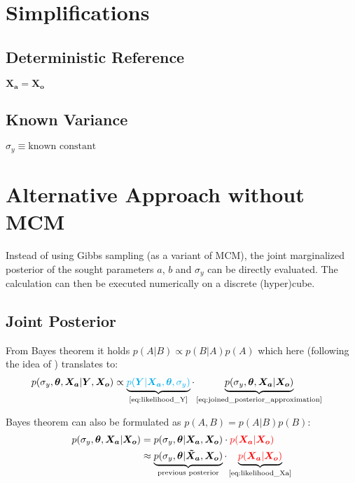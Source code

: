 \documentclass[10pt]{article}
\renewcommand{\vec}[1]{\boldsymbol{#1}}
\begin{document}
    
\section{Simplifications}

\subsection{Deterministic Reference}
$\vec{X_a} = \vec{X_o}$

\subsection{Known Variance}
$\sigma_y \equiv \text{known constant}$


\section{Alternative Approach without MCM}
Instead of using Gibbs sampling (as a variant of MCM), the joint marginalized posterior of the sought parameters $a$, $b$ and $\sigma_y$ can be directly evaluated. 
The calculation can then be executed numerically on a discrete (hyper)cube. 

\subsection{Joint Posterior}
From Bayes theorem it holds $p(A | B) \propto p(B | A) p(A)$ which here (following the idea of \cite{dellaportas_1995}) translates to:
\begin{align}
    p(\sigma_y, \vec{\theta}, \vec{X_a} | \vec{Y}, \vec{X_o}) 
    &\propto \underbrace{{\color{cyan} p(\vec{Y} | \vec{X_a}, \vec{\theta}, \sigma_y)}}_{\text{\cref{eq:likelihood_Y}}} 
    \cdot \underbrace{p(\sigma_y, \vec{\theta}, \vec{X_a} | \vec{X_o})}_{\text{\cref{eq:joined_posterior_approximation}}}  \label{eq:joint_posterior_with_Xa}
\end{align}

Bayes theorem can also be formulated as $p(A, B) = p(A|B) p(B)$:
\begin{align}
    p(\sigma_y, \vec{\theta}, \vec{X_a} | \vec{X_o})
    &= p(\sigma_y, \vec{\theta} |  \vec{X_a}, \vec{X_o})
    \cdot {\color{red} p(\vec{X_a} | \vec{X_o})} \label{eq:joined_posterior} \\
    &\approx \underbrace{p(\sigma_y, \vec{\theta} |  \vec{\tilde{X}_a}, \vec{X_o})}_{\text{previous posterior}}
    \cdot \underbrace{{\color{red} p(\vec{X_a} | \vec{X_o})}}_{\text{\cref{eq:likelihood_Xa}}} \label{eq:joined_posterior_approximation}
\end{align}
\end{document}

